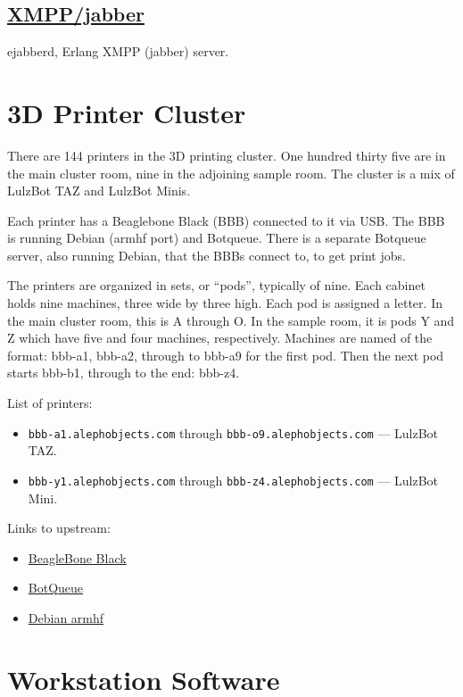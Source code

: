 \subsection{\href{http://www.ejabberd.im/}{XMPP/jabber}}
ejabberd, Erlang XMPP (jabber) server.


\section{3D Printer Cluster}
There are 144 printers in the 3D printing cluster. One hundred thirty five are
in the main cluster room, nine in the adjoining sample room. The cluster is a
mix of LulzBot TAZ and LulzBot Minis.

Each printer has a Beaglebone Black (BBB) connected to it via USB. The
BBB is running Debian (armhf port) and Botqueue. There is a separate Botqueue
server, also running Debian, that the BBBs connect to, to get print jobs.

The printers are organized in sets, or ``pods'', typically of nine. Each cabinet
holds nine machines, three wide by three high. Each pod is assigned a letter.
In the main cluster room, this is A through O. In the sample room, it is pods
Y and Z which have five and four machines, respectively. Machines are named
of the format: bbb-a1, bbb-a2, through to bbb-a9 for the first pod. Then the
next pod starts bbb-b1, through to the end: bbb-z4.

List of printers:
\begin{itemize}
\item \texttt{bbb-a1.alephobjects.com} through
      \texttt{bbb-o9.alephobjects.com} --- LulzBot TAZ.
\item \texttt{bbb-y1.alephobjects.com} through
      \texttt{bbb-z4.alephobjects.com} --- LulzBot Mini.
\end{itemize}

Links to upstream:
\begin{itemize}
\item \href{http://beagleboard.org/}{BeagleBone Black}
\item \href{http://botqueue.org/}{BotQueue}
\item \href{https://wiki.debian.org/ArmHardFloatPort}{Debian armhf}
\end{itemize}

\section{Workstation Software}

